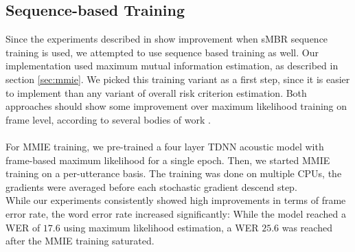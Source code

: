 \subsection{Sequence-based Training}
Since the experiments described in \cite{peddinti2015jhu} show improvement when sMBR sequence training is used, we attempted to use sequence based training as well. Our implementation used maximum mutual information estimation, as described in section \ref{sec:mmie}. We picked this training variant as a first step, since it is easier to implement than any variant of overall risk criterion estimation. Both approaches should show some improvement over maximum likelihood training on frame level, according to several bodies of work \cite{povey2005discriminative} \cite{ghoshal2013sequence}. \\ \\
For MMIE training, we pre-trained a four layer TDNN acoustic model with frame-based maximum likelihood for a single epoch. Then, we started MMIE training on a per-utterance basis. The training was done on multiple CPUs, the gradients were averaged before each stochastic gradient descend step. \\ 
While our experiments consistently showed high improvements in terms of frame error rate, the word error rate increased significantly: While the model reached a WER of $17.6$ using maximum likelihood estimation, a WER $25.6$ was reached after the MMIE training saturated. \\


